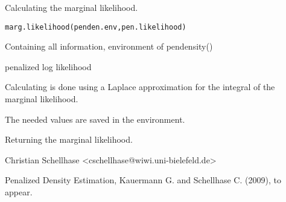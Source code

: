\begin{Description}\relax
Calculating the marginal likelihood.
\end{Description}
\begin{Usage}
\begin{verbatim}
marg.likelihood(penden.env,pen.likelihood)
\end{verbatim}
\end{Usage}
\begin{Arguments}
\begin{ldescription}
\item[\code{penden.env}] Containing all information, environment of pendensity()
\item[\code{pen.likelihood}] penalized log likelihood
\end{ldescription}
\end{Arguments}
\begin{Details}\relax
Calculating is done using a Laplace approximation for the integral of the marginal likelihood.

The needed values are saved in the environment.
\end{Details}
\begin{Value}
Returning the marginal likelihood.
\end{Value}
\begin{Author}\relax
Christian Schellhase <cschellhase@wiwi.uni-bielefeld.de>
\end{Author}
\begin{References}\relax
Penalized Density Estimation, Kauermann G. and Schellhase C. (2009), to appear.
\end{References}

